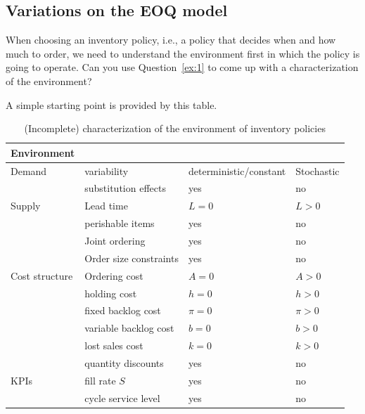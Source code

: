 \subsection{Variations on the EOQ model}
\label{sec:variations-eoq-model}

\begin{question}
  When choosing an inventory policy, i.e., a policy that decides when
  and how much to order, we need to understand the environment first
  in which the policy is going to operate. Can you use
  Question~\ref{ex:1} to come up with a characterization of the environment? 
  \begin{solution}
    A simple starting point is provided by this table.
    \begin{table}[h]
      \centering
    \begin{tabular}{l|l|l|l}
      Environment && &  \\ \hline
Demand & variability &deterministic/constant & Stochastic \\ 
& substitution effects & yes & no \\
\hline Supply & Lead time & $L=0$& $L>0$ \\ 
& perishable items & yes & no\\
& Joint ordering & yes & no\\
& Order size constraints &yes & no \\
\hline Cost structure &Ordering cost & $A=0$ & $A>0$ \\ 
& holding cost & $h=0$ &$h>0$ \\
& fixed backlog cost & $\pi=0$ &$\pi>0$\\
&variable backlog cost & $b=0$ &$b>0$\\
&lost sales cost &$k=0$ & $k>0$ \\
&quantity discounts &yes & no \\
\hline KPIs &fill rate $S$ & yes & no\\ 
& cycle service level &yes& no\\
    \end{tabular}
    \caption{(Incomplete) characterization of the environment of inventory policies}
      \label{tab:environment}
    \end{table}
  \end{solution}
\end{question}

